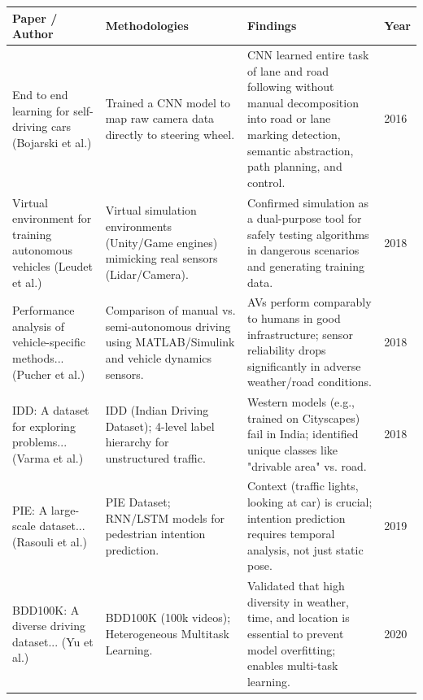 \begin{table}[h!]
    \centering
    \begin{tabular}{|p{3.5cm}|p{4cm}|p{3.9cm}|p{1.9cm}|}
    \hline
    \textbf{Paper / Author} & \textbf{Methodologies} & \textbf{Findings}& \textbf{Year}\\
    \hline
    End to end learning for self-driving cars (Bojarski et al.) & 
    Trained a CNN model to map raw camera data directly to steering wheel. & 
    CNN learned entire task of lane and road following without manual decomposition into road or lane marking detection, semantic abstraction, path planning, and control. & 
    2016 \\
    \hline
    Virtual environment for training autonomous vehicles (Leudet et al.) & 
    Virtual simulation environments (Unity/Game engines) mimicking real sensors (Lidar/Camera). & 
    Confirmed simulation as a dual-purpose tool for safely testing algorithms in dangerous scenarios and generating training data. & 
    2018 \\
    \hline
    Performance analysis of vehicle-specific methods... (Pucher et al.) & 
    Comparison of manual vs. semi-autonomous driving using MATLAB/Simulink and vehicle dynamics sensors. & 
    AVs perform comparably to humans in good infrastructure; sensor reliability drops significantly in adverse weather/road conditions. & 
    2018 \\
    \hline
    IDD: A dataset for exploring problems... (Varma et al.) & 
    IDD (Indian Driving Dataset); 4-level label hierarchy for unstructured traffic. & 
    Western models (e.g., trained on Cityscapes) fail in India; identified unique classes like "drivable area" vs. road. & 
    2018 \\
    \hline
    PIE: A large-scale dataset... (Rasouli et al.) & 
    PIE Dataset; RNN/LSTM models for pedestrian intention prediction. & 
    Context (traffic lights, looking at car) is crucial; intention prediction requires temporal analysis, not just static pose. & 
    2019 \\
    \hline
    BDD100K: A diverse driving dataset... (Yu et al.) & 
    BDD100K (100k videos); Heterogeneous Multitask Learning. & 
    Validated that high diversity in weather, time, and location is essential to prevent model overfitting; enables multi-task learning. & 
    2020 \\
    \hline
    \end{tabular}
\end{table}
